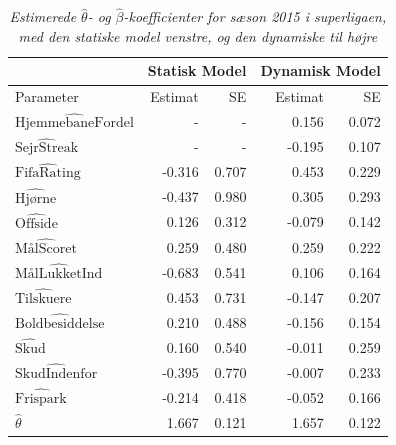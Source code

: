 \documentclass[11pt,a4paper]{article}
\begin{document}
  \begin{table}[ht]
\centering
\begin{adjustbox}{max width=\textwidth}
\begin{tabular}{|l|rr|rr|}
\hline
\multicolumn{1}{|l|}{} & \multicolumn{2}{l|}{Statisk Model} & \multicolumn{2}{l|}{Dynamisk Model} \\
\hline
Parameter & Estimat & SE & Estimat & SE \\
  \hline
    $\hat{\text{HjemmebaneFordel}}$ & -      & -     & 0.156 & 0.072\\
    $\hat{\text{SejrStreak}}$       & -      & -     & -0.195 & 0.107\\
    $\hat{\text{FifaRating}}$       & -0.316 & 0.707 & 0.453 & 0.229\\
    $\hat{\text{Hjørne}}$           & -0.437 & 0.980 & 0.305 & 0.293\\
    $\hat{\text{Offside}}$          &  0.126 & 0.312 & -0.079 & 0.142\\
    $\hat{\text{MålScoret}}$        &  0.259 & 0.480 & 0.259 & 0.222\\
    $\hat{\text{MålLukketInd}}$     & -0.683 & 0.541 & 0.106 & 0.164\\
    $\hat{\text{Tilskuere}}$        &  0.453 & 0.731 & -0.147 & 0.207\\
    $\hat{\text{Boldbesiddelse}}$   &  0.210 & 0.488 & -0.156 & 0.154\\
    $\hat{\text{Skud}}$             &  0.160 & 0.540 & -0.011 & 0.259\\
    $\hat{\text{SkudIndenfor}}$     & -0.395 & 0.770 & -0.007 & 0.233\\
    $\hat{\text{Frispark}}$         & -0.214 & 0.418 & -0.052 & 0.166\\
    $\hat{\theta}$                  & 1.667  & 0.121 & 1.657 & 0.122\\
   \hline
\end{tabular}
\end{adjustbox}
\caption{\label{tab:Parameterestimater}\textit{Estimerede $\hat{\theta}$- og $\hat{\beta}$-koefficienter for sæson 2015 i superligaen, med den statiske model venstre, og den dynamiske til højre}}
\end{table}
\end{document}
